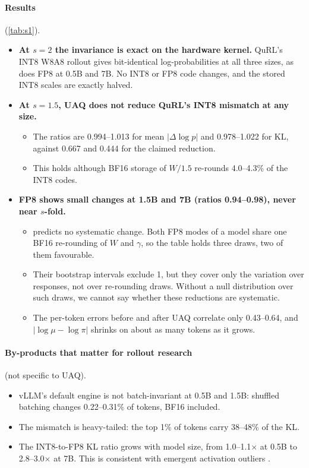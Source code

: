 \paragraph{Results} (\cref{tab:s1}).
\begin{itemize}[leftmargin=*,itemsep=2pt]
\item \textbf{At $s=2$ the invariance is exact on the hardware kernel.} QuRL's INT8 W8A8 rollout gives bit-identical log-probabilities at all three sizes, as does FP8 at 0.5B and 7B. No INT8 or FP8 code changes, and the stored INT8 scales are exactly halved.
\item \textbf{At $s=1.5$, UAQ does not reduce QuRL's INT8 mismatch at any size.}
  \begin{itemize}[leftmargin=*,itemsep=1pt]
  \item The ratios are 0.994--1.013 for mean $|\Delta\log p|$ and 0.978--1.022 for KL, against 0.667 and 0.444 for the claimed reduction.
  \item This holds although BF16 storage of $W/1.5$ re-rounds 4.0--4.3\% of the INT8 codes.
  \end{itemize}
\item \textbf{FP8 shows small changes at 1.5B and 7B (ratios 0.94--0.98), never near $s$-fold.}
  \begin{itemize}[leftmargin=*,itemsep=1pt]
  \item {} predicts no systematic change. Both FP8 modes of a model share one BF16 re-rounding of $W$ and $\gamma$, so the table holds three draws, two of them favourable.
  \item Their bootstrap intervals exclude 1, but they cover only the variation over responses, not over re-rounding draws. Without a null distribution over such draws, we cannot say whether these reductions are systematic.
  \item The per-token errors before and after UAQ correlate only 0.43--0.64, and $|\log\mu-\log\pi|$ shrinks on about as many tokens as it grows.
  \end{itemize}
\end{itemize}

\paragraph{By-products that matter for rollout research} (not specific to UAQ).
\begin{itemize}[leftmargin=*,itemsep=1pt]
\item vLLM's default engine is not batch-invariant at 0.5B and 1.5B: shuffled batching changes 0.22--0.31\% of tokens, BF16 included.
\item The mismatch is heavy-tailed: the top 1\% of tokens carry 38--48\% of the KL.
\item The INT8-to-FP8 KL ratio grows with model size, from 1.0--1.1$\times$ at 0.5B to 2.8--3.0$\times$ at 7B. This is consistent with emergent activation outliers \citep{dettmers2022llmint8}.
\end{itemize}

